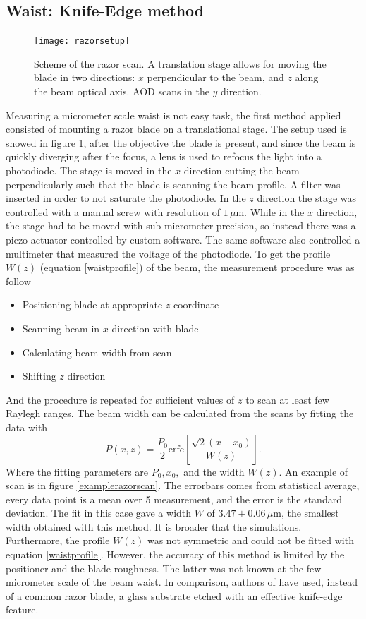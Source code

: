 \subsection{Waist: Knife-Edge method}
\begin{figure}[H]
\centering
\texttt{[image: razorsetup]}
\caption{Scheme of the razor scan. A translation stage allows for moving the blade in two directions: $x$ perpendicular to the beam, and $z$ along the beam optical axis. AOD scans in the $y$ direction.}
\label{razorscan}
\end{figure}
Measuring a micrometer scale waist is not easy task, the first method applied consisted of mounting a razor blade on a translational stage. The setup used is showed in figure \ref{razorscan}, after the objective the blade is present, and since the beam is quickly diverging after the focus, a lens is used to refocus the light into a photodiode. The stage is moved in the $x$ direction cutting the beam perpendicularly such that the blade is scanning the beam profile. A filter was inserted in order to not saturate the photodiode.
In the $z$ direction the stage was controlled with a manual screw with resolution of $1\,\mu$m. While in the $x$ direction, the stage had to be moved with sub-micrometer precision, so instead there was a piezo actuator controlled by custom software. The same software also controlled a multimeter that measured the voltage of the photodiode. To get the profile $W(z)$ (equation \eqref{waistprofile}) of the beam, the measurement procedure was as follow
\begin{itemize}
\item Positioning blade at appropriate $z$ coordinate
\item Scanning beam in $x$ direction with blade
\item Calculating beam width from scan
\item Shifting $z$ direction
\end{itemize}
And the procedure is repeated for sufficient values of $z$ to scan at least few Raylegh ranges. The beam width can be calculated from the scans by fitting the data with \cite{knifeedge}
\begin{equation}
P(x,z) = \frac{P_0}{2}\text{erfc}\left[\frac{\sqrt{2}(x-x_0)}{W(z)} \right].
\end{equation}
Where the fitting parameters are $P_0, x_0,$ and the width $W(z)$. An example of scan is in figure \ref{examplerazorscan}. The errorbars comes from statistical average, every data point is a mean over 5 measurement, and the error is the standard deviation. The fit in this case gave a width $W$ of $3.47\pm 0.06\,\mu$m, the smallest width obtained with this method. It is broader that the simulations. Furthermore, the profile $W(z)$ was not symmetric and could not be fitted with equation \eqref{waistprofile}. However, the accuracy of this method is limited by the positioner and the blade roughness. The latter was not known at the few micrometer scale of the beam waist. In comparison, authors of \cite{Cannon:86} have used, instead of a common razor blade, a glass substrate etched with an effective knife-edge feature.
